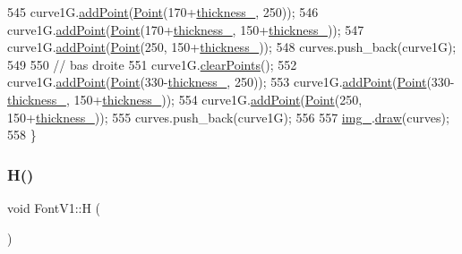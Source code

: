 \begin{DoxyCode}
545     curve1G.\mbox{\hyperlink{class_bezier_curve_a38d16c18b36ae45619b05e26e226cf34}{addPoint}}(\mbox{\hyperlink{class_point}{Point}}(170+\mbox{\hyperlink{class_font_v1_aed8040e76be9a52833627b92f0fb4e5f}{thickness\_}}, 250));
546     curve1G.\mbox{\hyperlink{class_bezier_curve_a38d16c18b36ae45619b05e26e226cf34}{addPoint}}(\mbox{\hyperlink{class_point}{Point}}(170+\mbox{\hyperlink{class_font_v1_aed8040e76be9a52833627b92f0fb4e5f}{thickness\_}}, 150+\mbox{\hyperlink{class_font_v1_aed8040e76be9a52833627b92f0fb4e5f}{thickness\_}}));
547     curve1G.\mbox{\hyperlink{class_bezier_curve_a38d16c18b36ae45619b05e26e226cf34}{addPoint}}(\mbox{\hyperlink{class_point}{Point}}(250, 150+\mbox{\hyperlink{class_font_v1_aed8040e76be9a52833627b92f0fb4e5f}{thickness\_}}));
548     curves.push\_back(curve1G);
549 
550     \textcolor{comment}{// bas droite}
551     curve1G.\mbox{\hyperlink{class_bezier_curve_a0ba8ce66d5af5971ae6a1b506029728e}{clearPoints}}();
552     curve1G.\mbox{\hyperlink{class_bezier_curve_a38d16c18b36ae45619b05e26e226cf34}{addPoint}}(\mbox{\hyperlink{class_point}{Point}}(330-\mbox{\hyperlink{class_font_v1_aed8040e76be9a52833627b92f0fb4e5f}{thickness\_}}, 250));
553     curve1G.\mbox{\hyperlink{class_bezier_curve_a38d16c18b36ae45619b05e26e226cf34}{addPoint}}(\mbox{\hyperlink{class_point}{Point}}(330-\mbox{\hyperlink{class_font_v1_aed8040e76be9a52833627b92f0fb4e5f}{thickness\_}}, 150+\mbox{\hyperlink{class_font_v1_aed8040e76be9a52833627b92f0fb4e5f}{thickness\_}}));
554     curve1G.\mbox{\hyperlink{class_bezier_curve_a38d16c18b36ae45619b05e26e226cf34}{addPoint}}(\mbox{\hyperlink{class_point}{Point}}(250, 150+\mbox{\hyperlink{class_font_v1_aed8040e76be9a52833627b92f0fb4e5f}{thickness\_}}));
555     curves.push\_back(curve1G);
556 
557     \mbox{\hyperlink{class_font_v1_a00569e3e3c4b70f437b63f396f735fb0}{img\_}}.\mbox{\hyperlink{class_image_a8d162f3cab956131d58708c09aa560b0}{draw}}(curves);
558 \}
\end{DoxyCode}
\mbox{\label{class_font_v1_aac6c3d7f8116c21fd9339d07aa63a797}} 
\subsubsection{\texorpdfstring{H()}{H()}}
{\footnotesize\ttfamily void Font\+V1\+::H (\begin{DoxyParamCaption}{ }\end{DoxyParamCaption})}



